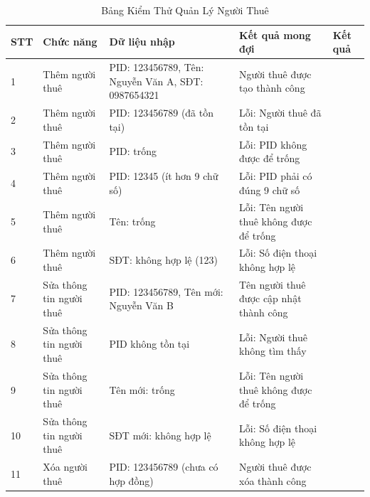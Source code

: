 \documentclass[12pt,a4paper]{article}
\begin{document}
\begin{table}[h!]
    \centering
    \caption{Bảng Kiểm Thử Quản Lý Người Thuê}
    \label{tab:tenant_management}
    \vspace{2mm}

    \begin{small}
    \begin{tabularx}{\textwidth}{|p{0.8cm}|p{2.5cm}|p{3cm}|p{3cm}|p{2.5cm}|}
    \hline
    \textbf{STT} & \textbf{Chức năng} & \textbf{Dữ liệu nhập} & \textbf{Kết quả mong đợi} & \textbf{Kết quả} \\ \hline

    1 & Thêm người thuê & PID: 123456789, Tên: Nguyễn Văn A, SĐT: 0987654321 & Người thuê được tạo thành công & \\ \hline

    2 & Thêm người thuê & PID: 123456789 (đã tồn tại) & Lỗi: Người thuê đã tồn tại & \\ \hline

    3 & Thêm người thuê & PID: trống & Lỗi: PID không được để trống & \\ \hline

    4 & Thêm người thuê & PID: 12345 (ít hơn 9 chữ số) & Lỗi: PID phải có đúng 9 chữ số & \\ \hline

    5 & Thêm người thuê & Tên: trống & Lỗi: Tên người thuê không được để trống & \\ \hline

    6 & Thêm người thuê & SĐT: không hợp lệ (123) & Lỗi: Số điện thoại không hợp lệ & \\ \hline

    7 & Sửa thông tin người thuê & PID: 123456789, Tên mới: Nguyễn Văn B & Tên người thuê được cập nhật thành công & \\ \hline

    8 & Sửa thông tin người thuê & PID không tồn tại & Lỗi: Người thuê không tìm thấy & \\ \hline

    9 & Sửa thông tin người thuê & Tên mới: trống & Lỗi: Tên người thuê không được để trống & \\ \hline

    10 & Sửa thông tin người thuê & SĐT mới: không hợp lệ & Lỗi: Số điện thoại không hợp lệ & \\ \hline

    11 & Xóa người thuê & PID: 123456789 (chưa có hợp đồng) & Người thuê được xóa thành công & \\ \hline


\end{tabularx}
\end{small}
\end{table}
\end{document}
